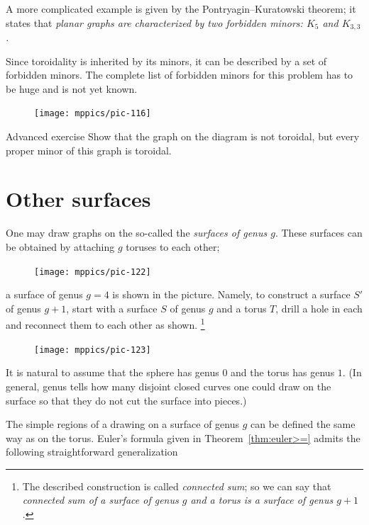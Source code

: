 A more complicated example is given by the Pontryagin--Kuratowski theorem;
it states that \textit{planar graphs are characterized by two forbidden minors: $K_5$ and $K_{3,3}$.}

Since toroidality is inherited by its minors, it can be described by a set of forbidden minors.
The complete list of forbidden minors for this problem has to be huge and is not yet known.

{

\begin{figure}
\vskip-7mm
\centering
\texttt{[image: mppics/pic-116]}
\vskip0mm
\end{figure}

\begin{thm}{Advanced exercise}\label{ex:nontoroidal}
Show that the graph on the diagram is not toroidal,
but every proper minor of this graph is toroidal.
\end{thm}

}

\section{Other surfaces}

One may draw graphs on the so-called the \emph{surfaces of genus $g$}.
These surfaces can be obtained by attaching $g$ toruses to each other; 
\begin{figure}[ht!]%
\vskip-0mm
\centering
\texttt{[image: mppics/pic-122]}
\vskip-0mm
\end{figure}
a surface of genus $g=4$ is shown in the picture.
Namely, to construct a surface $S'$ of genus $g+1$, start with a surface $S$ of genus $g$ and a torus $T$, drill a hole in each and reconnect them to each other as shown.%
\footnote{The described construction is called \emph{connected sum}; so we can say that \textit{connected sum of a surface of genus $g$ and a torus is a surface of genus $g+1$}.}
\begin{figure}[ht!]%
\vskip-0mm
\centering
\texttt{[image: mppics/pic-123]}
\vskip-0mm
\end{figure}


It is natural to assume that the sphere has genus $0$ and the torus has genus $1$.
(In general, genus tells how many disjoint closed curves one could draw on the surface so that they do not cut the surface into pieces.)

The simple regions of a drawing on a surface of genus $g$ can be defined the same way as on the torus.
Euler's formula given in Theorem~\ref{thm:euler>=} admits the following straightforward generalization

